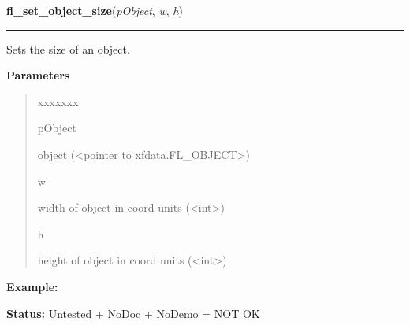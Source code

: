 \hspace{.8\funcindent}\begin{boxedminipage}{\funcwidth}

    \raggedright \textbf{fl\_set\_object\_size}(\textit{pObject}, \textit{w}, \textit{h})

    \vspace{-1.5ex}

    \rule{\textwidth}{0.5\fboxrule}
\setlength{\parskip}{2ex}
    Sets the size of an object.

\setlength{\parskip}{1ex}
      \textbf{Parameters}
      \vspace{-1ex}

      \begin{quote}
        \begin{Ventry}{xxxxxxx}

          \item[pObject]

          object ({\textless}pointer to xfdata.FL\_OBJECT{\textgreater})

          \item[w]

          width of object in coord units ({\textless}int{\textgreater})

          \item[h]

          height of object in coord units ({\textless}int{\textgreater})

        \end{Ventry}

      \end{quote}

\textbf{Example:} 

\textbf{Status:} Untested + NoDoc + NoDemo = NOT OK



    \end{boxedminipage}

    \label{xformslib:library:fl_set_object_automatic}

    \vspace{0.5ex}

